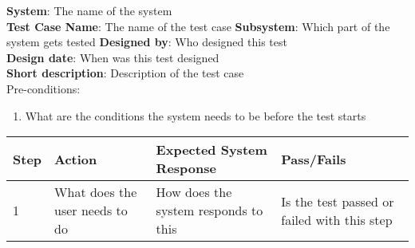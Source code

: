 \textbf{System}:  The name of the system \\
\textbf{Test Case Name}:  The name of the test case
\textbf{Subsystem}:  Which part of the system gets tested
\textbf{Designed by}:  Who designed this test\\
\textbf{Design date}: When was this test designed \\
\textbf{Short description}: Description of the test case \\

Pre-conditions: \\
\begin{enumerate}
\item What are the conditions the system needs to be before the test starts
\end{enumerate}

\begin{longtable}{ | p{0.8cm} | p{4.5cm} | p{6cm} | p{1.5cm} |}
\hline
Step & Action & Expected System Response & Pass/Fails  \\ \hline
1 & What does the user needs to do & How does the system responds to this & Is the test passed or failed with this step  \\ \hline

\end{longtable}